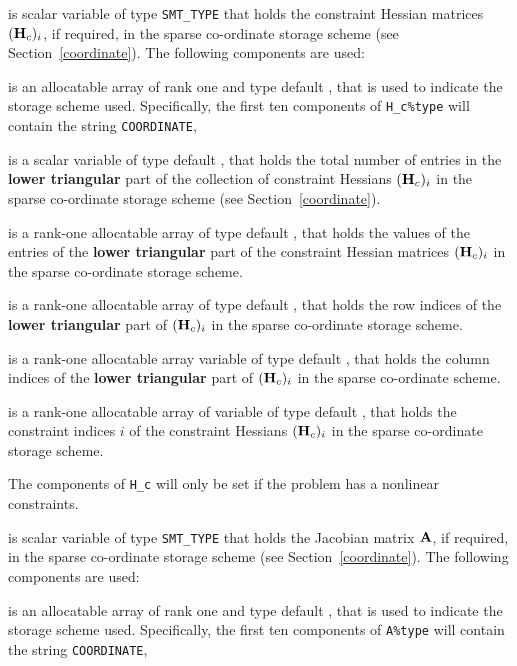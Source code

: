 \documentclass{galahad}
\begin{document}
\begin{description}
 is scalar variable of type {\tt SMT\_TYPE}
that holds the constraint Hessian matrices $({\mathbf{H}}_c)_i$, if required,
in the sparse co-ordinate storage scheme (see Section~\ref{coordinate}).
The following components are used:

\begin{description}

 is an allocatable array of rank one and type default
\character, that is used to indicate the storage scheme used. Specifically,
the first ten components of {\tt H\_c\%type} will contain the
string {\tt COORDINATE},

 is a scalar variable of type default \integer, that
holds the total number of entries in the {\bf lower triangular} part of
the collection of constraint Hessians $({\mathbf{H}}_c)_i$
in the sparse co-ordinate storage scheme (see Section~\ref{coordinate}).

 is a rank-one allocatable array of type default \realdp, that
holds the values of the entries of the {\bf lower triangular} part
of the constraint Hessian matrices $({\mathbf{H}}_c)_i$
in the sparse co-ordinate storage scheme.

 is a rank-one allocatable array of type default \integer,
that holds the row indices of the {\bf lower triangular} part of
$({\mathbf{H}}_c)_i$ in the sparse co-ordinate storage scheme.

 is a rank-one allocatable array variable of type default
\integer, that holds the column indices of the {\bf lower triangular} part of
$({\mathbf{H}}_c)_i$ in the sparse co-ordinate scheme.

 is a rank-one allocatable array of variable of type
default \integer, that holds the constraint indices $i$
of the constraint Hessians $({\mathbf{H}}_c)_i$
in the sparse co-ordinate storage scheme.
\end{description}

The components of {\tt H\_c} will only be set if the problem has a
nonlinear constraints.

 is scalar variable of type {\tt SMT\_TYPE}
that holds the Jacobian matrix ${\mathbf{A}}$, if required,
in the sparse co-ordinate storage scheme (see Section~\ref{coordinate}).
The following components are used:

\begin{description}

 is an allocatable array of rank one and type default \character,
that is used to indicate the storage scheme used. Specifically,
the first ten components of {\tt A\%type} will contain the
string {\tt COORDINATE},


\end{description}
\end{description}
\end{document}
